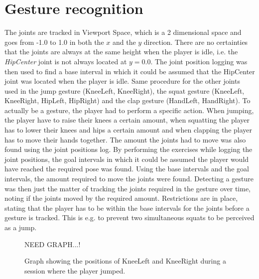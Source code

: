 \documentclass[11pt]{report}
\begin{document}
\section{Gesture recognition}
The joints are tracked in Viewport Space, which is a 2 dimensional space and goes from -1.0 to 1.0 in both the $x$ and the $y$ direction. There are no certainties that the joints are always at the same height when the player is idle, i.e. the \emph{HipCenter} joint is not always located at $y = 0.0$. The joint position logging was then used to find a base interval in which it could be assumed that the HipCenter joint was located when the player is idle. Same procedure for the other joints used in the jump gesture (KneeLeft, KneeRight), the squat gesture (KneeLeft, KneeRight, HipLeft, HipRight) and the clap gesture (HandLeft, HandRight). To actually be a gesture, the player had to perform a specific action. When jumping, the player have to raise their knees a certain amount, when squatting the player has to lower their knees and hips a certain amount and when clapping the player has to move their hands together. The amount the joints had to move was also found using the joint positions log. By performing the exercises while logging the joint positions, the goal intervals in which it could be assumed the player would have reached the required pose was found. Using the base intervals and the goal intervals, the amount required to move the joints were found. Detecting a gesture was then just the matter of tracking the joints required in the gesture over time, noting if the joints moved by the required amount. Restrictions are in place, stating that the player has to be within the base intervals for the joints before a gesture is tracked. This is e.g. to prevent two simultaneous squats to be perceived as a jump.

\begin{figure}[H]
NEED GRAPH...!
\caption{Graph showing the positions of KneeLeft and KneeRight during a session where the player jumped.}
\end{figure}
\end{document}
